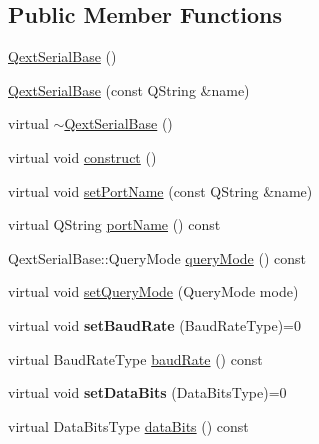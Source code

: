\subsection*{Public Member Functions}
\begin{DoxyCompactItemize}
\item 
\mbox{\hyperlink{class_qext_serial_base_aba0fc6d8b5c675c91ebff90fc6415748}{Qext\+Serial\+Base}} ()
\item 
\mbox{\hyperlink{class_qext_serial_base_a136b187c6684be0bac22e616b053f7b7}{Qext\+Serial\+Base}} (const Q\+String \&name)
\item 
virtual \mbox{\hyperlink{class_qext_serial_base_a80eeebbf4585220ec3ced8fcebf6279f}{$\sim$\+Qext\+Serial\+Base}} ()
\item 
virtual void \mbox{\hyperlink{class_qext_serial_base_a7495b472b5e269d04c0c2e856901207f}{construct}} ()
\item 
virtual void \mbox{\hyperlink{class_qext_serial_base_a1c9f83f00f0ea53ee06b757e197cdf64}{set\+Port\+Name}} (const Q\+String \&name)
\item 
virtual Q\+String \mbox{\hyperlink{class_qext_serial_base_a5ec73bcceef66b910bd42a1ab0b6b66f}{port\+Name}} () const
\item 
Qext\+Serial\+Base\+::\+Query\+Mode \mbox{\hyperlink{class_qext_serial_base_a87c78f3a69a8576b9c6a6e4c7318d70a}{query\+Mode}} () const
\item 
virtual void \mbox{\hyperlink{class_qext_serial_base_abd8e3b9a5028f9c2645ba89c0fc08a6b}{set\+Query\+Mode}} (Query\+Mode mode)
\item 
\mbox{\label{class_qext_serial_base_a05b59a48366ae452bf8e033f83402543}} 
virtual void {\bfseries set\+Baud\+Rate} (Baud\+Rate\+Type)=0
\item 
virtual Baud\+Rate\+Type \mbox{\hyperlink{class_qext_serial_base_ab85f4bc317e0b03205f4360529d8caf3}{baud\+Rate}} () const
\item 
\mbox{\label{class_qext_serial_base_a651f67ec7818b55c0053b47546c56ab5}} 
virtual void {\bfseries set\+Data\+Bits} (Data\+Bits\+Type)=0
\item 
virtual Data\+Bits\+Type \mbox{\hyperlink{class_qext_serial_base_afebe4d557c5c944ccd1039cee91871fd}{data\+Bits}} () const
\item 
\mbox{\label{class_qext_serial_base_ad57f8cb19a8a48012c1f607155eddedf}} 

\end{DoxyCompactItemize}
